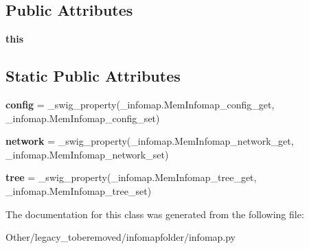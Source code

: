 \subsection*{Public Attributes}
\begin{DoxyCompactItemize}
\item 
\mbox{\label{classinfomapfolder_1_1infomap_1_1MemInfomap_a57444a43cbccda35b38aa3c165189a68}} 
{\bfseries this}
\end{DoxyCompactItemize}
\subsection*{Static Public Attributes}
\begin{DoxyCompactItemize}
\item 
\mbox{\label{classinfomapfolder_1_1infomap_1_1MemInfomap_a935ab42ad27cdad1b3047629fc2263e1}} 
{\bfseries config} = \+\_\+swig\+\_\+property(\+\_\+infomap.\+Mem\+Infomap\+\_\+config\+\_\+get, \+\_\+infomap.\+Mem\+Infomap\+\_\+config\+\_\+set)
\item 
\mbox{\label{classinfomapfolder_1_1infomap_1_1MemInfomap_a72d3719d1137701b1cee3959d9e747b1}} 
{\bfseries network} = \+\_\+swig\+\_\+property(\+\_\+infomap.\+Mem\+Infomap\+\_\+network\+\_\+get, \+\_\+infomap.\+Mem\+Infomap\+\_\+network\+\_\+set)
\item 
\mbox{\label{classinfomapfolder_1_1infomap_1_1MemInfomap_a930279ee38954649b43b0bf2666a92b3}} 
{\bfseries tree} = \+\_\+swig\+\_\+property(\+\_\+infomap.\+Mem\+Infomap\+\_\+tree\+\_\+get, \+\_\+infomap.\+Mem\+Infomap\+\_\+tree\+\_\+set)
\end{DoxyCompactItemize}


The documentation for this class was generated from the following file\+:\begin{DoxyCompactItemize}
\item 
Other/legacy\+\_\+toberemoved/infomapfolder/infomap.\+py\end{DoxyCompactItemize}
